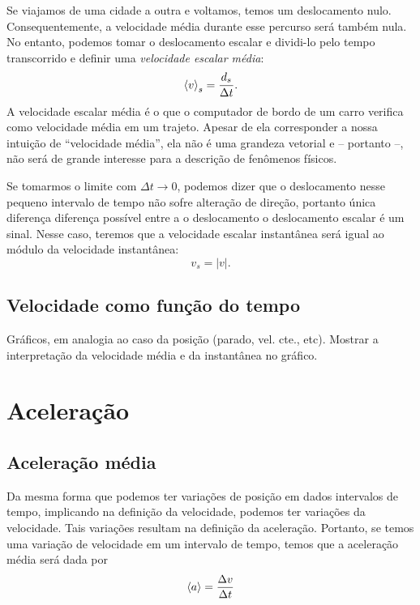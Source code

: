 Se viajamos de uma cidade a outra e voltamos, temos um deslocamento nulo. Consequentemente, a velocidade média durante esse percurso será também nula. No entanto, podemos tomar o deslocamento escalar e dividi-lo pelo tempo transcorrido e definir uma \emph{velocidade escalar média}:
\begin{equation}
  \left\langle{v}\right\rangle_s = \frac{d_s}{\Delta t}.
\end{equation}
%
A velocidade escalar média é o que o computador de bordo de um carro verifica como velocidade média em um trajeto. Apesar de ela corresponder a nossa intuição de ``velocidade média'', ela não é uma grandeza vetorial e -- portanto --, não será de grande interesse para a descrição de fenômenos físicos.

Se tomarmos o limite com $\Delta t \to 0$, podemos dizer que o deslocamento nesse pequeno intervalo de tempo não sofre alteração de direção, portanto única diferença diferença possível entre a o deslocamento o deslocamento escalar é um sinal. Nesse caso, teremos que a velocidade escalar instantânea será igual ao módulo da velocidade instantânea:
\begin{equation}
  v_s = |v|.
\end{equation}

\subsection{Velocidade como função do tempo}

Gráficos, em analogia ao caso da posição (parado, vel. cte., etc). Mostrar a interpretação da velocidade média e da instantânea no gráfico.

\section{Aceleração}

\subsection{Aceleração média}

Da mesma forma que podemos ter variações de posição em dados intervalos de tempo, implicando na definição da velocidade, podemos ter variações da velocidade. Tais variações resultam na definição da aceleração. Portanto, se temos uma variação de velocidade em um intervalo de tempo, temos que a aceleração média será dada por
\begin{equation}
  \left\langle{a}\right\rangle = \frac{\Delta v}{\Delta t}
\end{equation}

